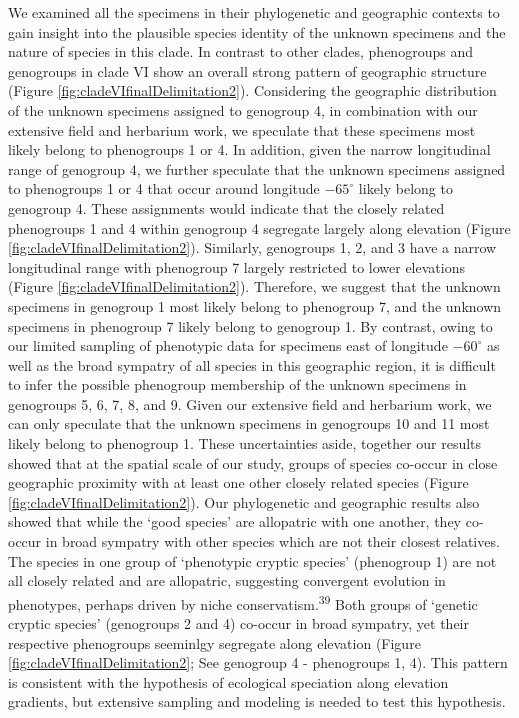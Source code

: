 \documentclass[
  11pt,
]{article}
\begin{document}
We examined all the specimens in their phylogenetic and geographic contexts to gain insight into the plausible species identity of the unknown specimens and the nature of species in this clade. In contrast to other clades, phenogroups and genogroups in clade VI show an overall strong pattern of geographic structure (Figure \ref{fig:cladeVIfinalDelimitation2}). Considering the geographic distribution of the unknown specimens assigned to genogroup 4, in combination with our extensive field and herbarium work, we speculate that these specimens most likely belong to phenogroups 1 or 4. In addition, given the narrow longitudinal range of genogroup 4, we further speculate that the unknown specimens assigned to phenogroups 1 or 4 that occur around longitude \(-65^\circ\) likely belong to genogroup 4. These assignments would indicate that the closely related phenogroups 1 and 4 within genogroup 4 segregate largely along elevation (Figure \ref{fig:cladeVIfinalDelimitation2}). Similarly, genogroups 1, 2, and 3 have a narrow longitudinal range with phenogroup 7 largely restricted to lower elevations (Figure \ref{fig:cladeVIfinalDelimitation2}). Therefore, we suggest that the unknown specimens in genogroup 1 most likely belong to phenogroup 7, and the unknown specimens in phenogroup 7 likely belong to genogroup 1. By contrast, owing to our limited sampling of phenotypic data for specimens east of longitude \(-60^\circ\) as well as the broad sympatry of all species in this geographic region, it is difficult to infer the possible phenogroup membership of the unknown specimens in genogroups 5, 6, 7, 8, and 9. Given our extensive field and herbarium work, we can only speculate that the unknown specimens in genogroups 10 and 11 most likely belong to phenogroup 1. These uncertainties aside, together our results showed that at the spatial scale of our study, groups of species co-occur in close geographic proximity with at least one other closely related species (Figure \ref{fig:cladeVIfinalDelimitation2}). Our phylogenetic and geographic results also showed that while the `good species' are allopatric with one another, they co-occur in broad sympatry with other species which are not their closest relatives. The species in one group of `phenotypic cryptic species' (phenogroup 1) are not all closely related and are allopatric, suggesting convergent evolution in phenotypes, perhaps driven by niche conservatism.\textsuperscript{39} Both groups of `genetic cryptic species' (genogroups 2 and 4) co-occur in broad sympatry, yet their respective phenogroups seeminlgy segregate along elevation (Figure \ref{fig:cladeVIfinalDelimitation2}; See genogroup 4 - phenogroups 1, 4). This pattern is consistent with the hypothesis of ecological speciation along elevation gradients, but extensive sampling and modeling is needed to test this hypothesis.
\end{document}
